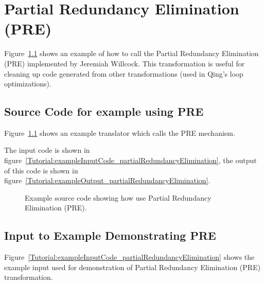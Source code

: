\chapter{Partial Redundancy Elimination (PRE)}

   Figure~\ref{Tutorial:example_partialRedundancyElimination} shows an
example of how to call the Partial Redundancy Elimination (PRE) 
implemented by Jeremiah Willcock.  This transformation is useful for cleaning up code
generated from other transformations (used in Qing's loop optimizations).

\section{Source Code for example using PRE}

    Figure~\ref{Tutorial:example_partialRedundancyElimination}
shows an example translator which calls the PRE mechanism.

The input code is shown in figure~\ref{Tutorial:exampleInputCode_partialRedundancyElimination},
the output of this code is shown in 
figure~\ref{Tutorial:exampleOutput_partialRedundancyElimination}.

\begin{figure}[!h]
{\indent
{\mySmallFontSize

\begin{latexonly}
   
\end{latexonly}

\begin{htmlonly}
   
\end{htmlonly}

}
}
\caption{Example source code showing how use Partial Redundancy Elimination (PRE). }
\label{Tutorial:example_partialRedundancyElimination}
\end{figure}



\section{Input to Example Demonstrating PRE}

   Figure~\ref{Tutorial:exampleInputCode_partialRedundancyElimination}
shows the example input used for demonstration of Partial Redundancy 
Elimination (PRE) transformation.

